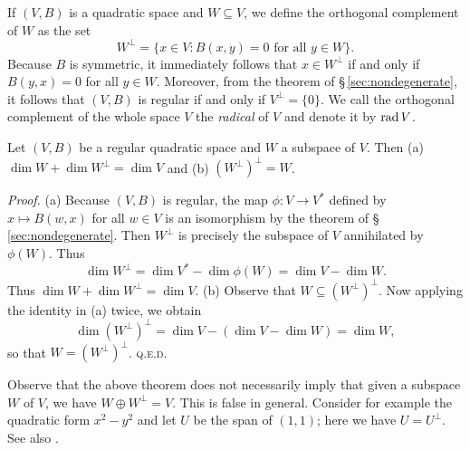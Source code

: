 If \((V, B)\) is a quadratic space and \(W \subseteq V\), we define the orthogonal complement of \(W\) as the set
\[
  W^{\perp} = \{x \in V : B(x, y) = 0 \text{ for all } y \in W\}.
\]
Because \(B\) is symmetric, it immediately follows that \(x \in W^{\perp}\) if and only if \(B(y, x) = 0\) for all \(y \in W\). Moreover, from the theorem of \S\,\ref{sec:nondegenerate}, it follows that \((V,B)\) is regular if and only if \(V^{\perp} = \{0\}\). We call the orthogonal complement of the whole space \(V\) the \emph{radical} of \(V\) and denote it by \(\operatorname{rad} V\).

\begin{theorem}\label{thm:orthogonal-complement}
    {\normalfont \cite[p.~7]{lam1973quadratic}}
    Let \((V, B)\) be a regular quadratic space and \(W\) a subspace of \(V\). Then {\normalfont (a)} \(\dim W + \dim W^{\perp} = \dim V\) and {\normalfont (b)} \((W^{\perp})^{\perp} = W\).
\end{theorem}

\emph{Proof.} (a) Because \((V, B)\) is regular, the map \(\phi: V \to V^*\) defined by \(x \mapsto B(w, x)\) for all \(w \in V\) is an isomorphism by the theorem of \S\,\ref{sec:nondegenerate}. Then \(W^{\perp}\) is precisely the subspace of \(V\) annihilated by \(\phi(W)\). Thus
\[
    \dim W^{\perp} = \dim V^* - \dim \phi(W) = \dim V - \dim W.
\]
Thus \(\dim W + \dim W^{\perp} = \dim V\). (b) Observe that \(W \subseteq (W^{\perp})^{\perp}\). Now applying the identity in (a) twice, we obtain
\[
  \dim (W^{\perp})^{\perp} = \dim V - (\dim V - \dim W) = \dim W,
\]
so that \(W = (W^{\perp})^{\perp}\). {\scshape q.e.d.}

Observe that the above theorem does not necessarily imply that given a subspace \(W\) of \(V\), we have \(W \oplus W^{\perp} = V\). This is false in general. Consider for example the quadratic form \(x^2 - y^2\) and let \(U\) be the span of \((1, 1)\); here we have \(U = U^{\perp}\). See also \cite{ormsbynotes}.

